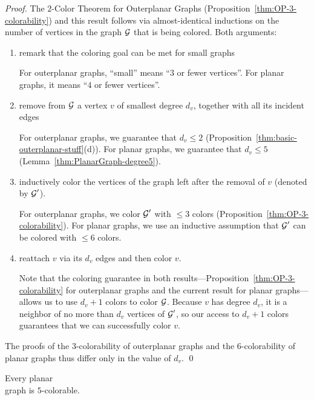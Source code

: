 \begin{proof}
The $2$-Color Theorem for Outerplanar Graphs
(Proposition~\ref{thm:OP-3-colorability}) and this result follows via
almost-identical inductions on the number of vertices in the graph $\mbox{$\cal G$}$
that is being colored.  Both arguments:
\begin{enumerate}
\item
remark that the coloring goal can be met for small graphs

For outerplanar graphs, ``small'' means ``$3$ or fewer vertices''.  For
planar graphs, it means ``$4$ or fewer vertices''.

\item
remove from $\mbox{$\cal G$}$ a vertex $v$ of smallest degree $d_v$, together with
all its incident edges

For outerplanar graphs, we guarantee that $d_v \leq 2$
(Proposition~\ref{thm:basic-outerplanar-stuff}(d)).  For planar
graphs, we guarantee that $d_v \leq 5$
(Lemma~\ref{thm:PlanarGraph-degree5}).

\item
inductively color the vertices of the graph left after the removal
of $v$ (denoted by $\mbox{$\cal G$}'$).

For outerplanar graphs, we color $\mbox{$\cal G$}'$ with $\leq 3$ colors
(Proposition~\ref{thm:OP-3-colorability}).  For planar
graphs, we use an inductive assumption that $\mbox{$\cal G$}'$ can be colored with
$\leq 6$ colors. 

\item
reattach $v$ via its $d_v$ edges and then color $v$.

Note that the coloring guarantee in both
results---Proposition~\ref{thm:OP-3-colorability} for outerplanar
graphs and the current result for planar graphs---allows us to use
$d_v +1$ colors to color $\mbox{$\cal G$}$.  Because $v$ has degree $d_v$, it is a
neighbor of no more than $d_v$ vertices of $\mbox{$\cal G$}'$, so our access to $d_v
+1$ colors guarantees that we can successfully color $v$.
\end{enumerate}
The proofs of the $3$-colorability of outerplanar graphs and the
$6$-colorability of planar graphs thus differ only in the value of
$d_v$.  \qed
\end{proof}

\bigskip


\bigskip

\begin{prop}
\label{thm:5colors}
\label{thm:P-5-colorability}
Every planar \\
graph is $5$-colorable.
\end{prop}

